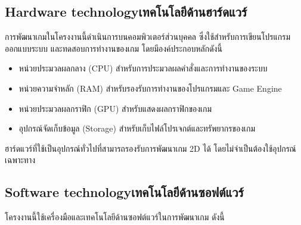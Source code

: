 \subsection{\ifenglish Hardware technology\else เทคโนโลยีด้านฮาร์ดแวร์\fi}

    \hspace{1.5em}การพัฒนาเกมในโครงงานนี้ดำเนินการบนคอมพิวเตอร์ส่วนบุคคล ซึ่งใช้สำหรับการเขียนโปรแกรม \\ออกแบบระบบ และทดสอบการทำงานของเกม โดยมีองค์ประกอบหลักดังนี้
    
    \begin{itemize}
        \item หน่วยประมวลผลกลาง (CPU) สำหรับการประมวลผลคำสั่งและการทำงานของระบบ
        \item หน่วยความจำหลัก (RAM) สำหรับรองรับการทำงานของโปรแกรมและ Game Engine
        \item หน่วยประมวลผลกราฟิก (GPU) สำหรับแสดงผลกราฟิกของเกม
        \item อุปกรณ์จัดเก็บข้อมูล (Storage) สำหรับเก็บไฟล์โปรเจกต์และทรัพยากรของเกม
    \end{itemize}

    ฮาร์ดแวร์ที่ใช้เป็นอุปกรณ์ทั่วไปที่สามารถรองรับการพัฒนาเกม 2D ได้ โดยไม่จำเป็นต้องใช้อุปกรณ์\\เฉพาะทาง

\subsection{\ifenglish Software technology\else เทคโนโลยีด้านซอฟต์แวร์\fi}

    \hspace{1.5em}โครงงานนี้ใช้เครื่องมือและเทคโนโลยีด้านซอฟต์แวร์ในการพัฒนาเกม ดังนี้

